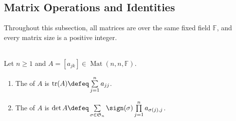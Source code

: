 \subsection{Matrix Operations and Identities}
Throughout this subsection, all matrices are over the same fixed field $\mathbb{F}$, and every matrix size is a positive integer.

\begin{definition} \label{def:matrix-trace-and-determinant} \\
Let $n\geq1$ and $A=[a_{jk}]\in\operatorname{Mat}(n,n,\mathbb{F})$.
\begin{enumerate}[label=(\roman*)]
\setlength{\itemsep}{0pt}
\item The  of $A$ is $\operatorname{tr}(A)\defeq\sum\limits_{j=1}^{n}a_{jj}$.
\item The  of $A$ is $\det A\defeq\sum\limits_{\sigma\in\mathfrak{S}_n}\sign(\sigma)\prod\limits_{j=1}^{n}a_{\sigma(j),j}$.
\end{enumerate}
\end{definition}

